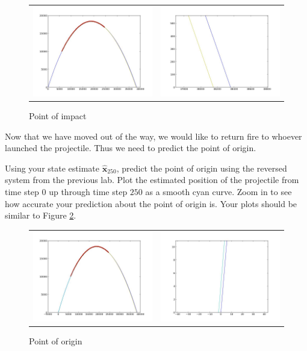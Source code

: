 \begin{figure}
	\centering
	\begin{tabular}{cc} 
	\includegraphics[width=.49\textwidth]{problem4_1.jpg} & 
	\includegraphics[width=.49\textwidth]{problem4_2.jpg}
	\end{tabular}
	\caption{Point of impact}
	\label{fig:problem4}
\end{figure}

Now that we have moved out of the way, we would like to return fire to whoever launched the projectile. 
Thus we need to predict the point of origin.

\begin{problem}
Using your state estimate $\widehat{\mathbf{x}}_{250}$, predict the point of origin using the reversed system from the previous lab.
Plot the estimated position of the projectile from time step $0$ up through time step $250$ as a smooth cyan curve. 
Zoom in to see how accurate your prediction about the point of origin is.
Your plots should be similar to Figure \ref{fig:problem5}.
\label{prob:origin_pt}
\end{problem}

\begin{figure}
	\centering
	\begin{tabular}{cc} 
	\includegraphics[width=.49\textwidth]{problem5_1.jpg} & 
	\includegraphics[width=.49\textwidth]{problem5_2.jpg}
	\end{tabular}
	\caption{Point of origin}
	\label{fig:problem5}
\end{figure}